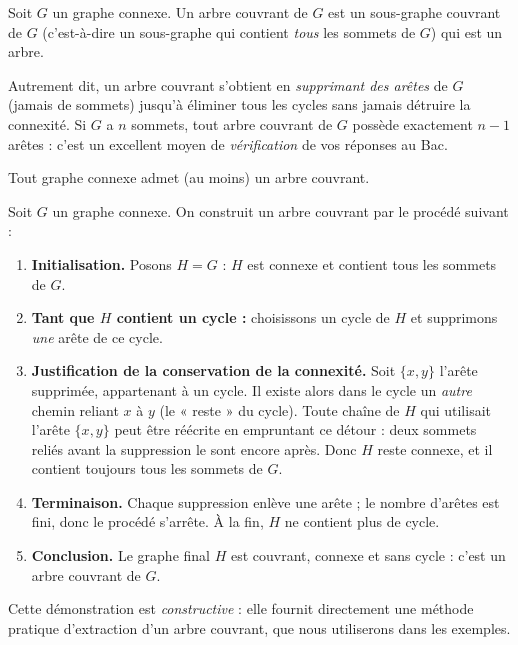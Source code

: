 \documentclass[11pt]{article}
\newcommand{\cle}[1]{{\popxbold\color{popdark}#1}}
\begin{document}
\begin{definition}
Soit $G$ un graphe connexe. Un \cle{arbre couvrant} de $G$ est un \cle{sous-graphe couvrant} de $G$ (c'est-à-dire un sous-graphe qui contient \emph{tous} les sommets de $G$) qui est un \cle{arbre}.
\end{definition}

Autrement dit, un arbre couvrant s'obtient en \emph{supprimant des arêtes} de $G$ (jamais de sommets) jusqu'à éliminer tous les cycles sans jamais détruire la connexité. Si $G$ a $n$ sommets, tout arbre couvrant de $G$ possède exactement $n - 1$ arêtes : c'est un excellent moyen de \emph{vérification} de vos réponses au Bac.

\begin{propriete}
Tout graphe connexe admet (au moins) un arbre couvrant.
\end{propriete}

\begin{experience}
Soit $G$ un graphe connexe. On construit un arbre couvrant par le procédé suivant :
\begin{enumerate}
\item \textbf{Initialisation.} Posons $H = G$ : $H$ est connexe et contient tous les sommets de $G$.
\item \textbf{Tant que $H$ contient un cycle :} choisissons un cycle de $H$ et supprimons \emph{une} arête de ce cycle.
\item \textbf{Justification de la conservation de la connexité.} Soit $\{x, y\}$ l'arête supprimée, appartenant à un cycle. Il existe alors dans le cycle un \emph{autre} chemin reliant $x$ à $y$ (le « reste » du cycle). Toute chaîne de $H$ qui utilisait l'arête $\{x,y\}$ peut être réécrite en empruntant ce détour : deux sommets reliés avant la suppression le sont encore après. Donc $H$ reste connexe, et il contient toujours tous les sommets de $G$.
\item \textbf{Terminaison.} Chaque suppression enlève une arête ; le nombre d'arêtes est fini, donc le procédé s'arrête. À la fin, $H$ ne contient plus de cycle.
\item \textbf{Conclusion.} Le graphe final $H$ est couvrant, connexe et sans cycle : c'est un arbre couvrant de $G$.
\end{enumerate}
Cette démonstration est \emph{constructive} : elle fournit directement une méthode pratique d'extraction d'un arbre couvrant, que nous utiliserons dans les exemples.
\end{experience}
\end{document}
